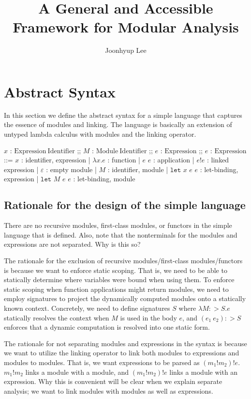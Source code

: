 \documentclass{article}
\title{A General and Accessible Framework for Modular Analysis}
\author{Joonhyup Lee}
\date{}
\theoremstyle{definition}
\newcommand*{\Expr}{\text{Expr}}
\newcommand*{\ExprVar}{\text{ExprVar}}
\newcommand*{\ModVar}{\text{ModVar}}
\newcommand*{\link}[2]{{#1}\mathtt{!}{#2}}
\newcommand*{\Let}{\mathtt{let}}
\begin{document}
\maketitle

\section{Abstract Syntax}

In this section we define the abstract syntax for a simple language that captures the essence of modules and linking.
The language is basically an extension of untyped lambda calculus with modules and the linking operator.

\begin{bnfgrammar}
  $x$ : $\mathrm{Expression\:Identifier}$ \in \ExprVar
  ;;
  $M$ : $\mathrm{Module\:Identifier}$ \in \ModVar
  ;;
  $e$ : $\mathrm{Expression}$ \in \Expr
  ;;
  $e$ : $\mathrm{Expression}$ ::= $x$ : identifier, expression
  | $\lambda x.e$ : function
  | $e$ $e$ : application
  | $\link{e}{e}$ : linked expression
  | $\varepsilon$ : empty module
  | $M$ : identifier, module
  | $\Let$ $x$ $e$ $e$ : let-binding, expression
  | $\Let$ $M$ $e$ $e$ : let-binding, module
\end{bnfgrammar}

\subsection{Rationale for the design of the simple language}

There are no recursive modules, first-class modules, or functors in the simple language that is defined.
Also, note that the nonterminals for the modules and expressions are not separated. Why is this so?

The rationale for the exclusion of recursive modules/first-class modules/functors is because we want to enforce static scoping.
That is, we need to be able to statically determine where variables were bound when using them.
To enforce static scoping when function applications might return modules, we need to employ signatures to project the dynamically computed modules onto a statically known context.
Concretely, we need to define signatures $S$ where $\lambda M:>S.e$ statically resolves the context when $M$ is used in the body $e$, and $(e_1\:e_2):>S$ enforces that a dynamic computation is resolved into one static form.

The rationale for not separating modules and expressions in the syntax is because we want to utilize the linking operator to link both modules to expressions and modules to modules.
That is, we want expressions to be parsed as $(m_1!m_2)!e$.
$\link{m_1}{m_2}$ links a module with a module, and $(m_1!m_2)!e$ links a module with an expression.
Why this is convenient will be clear when we explain separate analysis; we want to link modules with modules as well as expressions.
\end{document}
